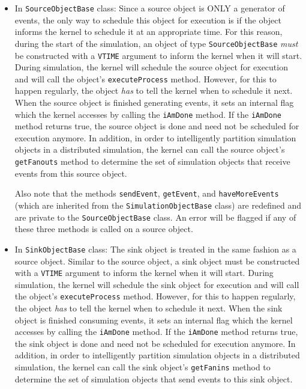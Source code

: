 \documentclass[11pt]{article}
\begin{document}
\begin{itemize}

\item In \texttt{SourceObjectBase} class:  Since a source object is ONLY a
  generator of events, the only way to schedule this object for execution
  is if the object informs the kernel to schedule it at an appropriate
  time.  For this reason, during the start of the simulation, an object of
  type \texttt{SourceObjectBase} \emph{must} be constructed with a
  \texttt{VTIME} argument to inform the kernel when it will start.  During
  simulation, the kernel will schedule the source object for execution and
  will call the object's \texttt{executeProcess} method. However, for this
  to happen regularly, the object \emph{has} to tell the kernel when to
  schedule it next.  When the source object is finished generating events,
  it sets an internal flag which the kernel accesses by calling the
  \texttt{iAmDone} method.  If the \texttt{iAmDone} method returns true,
  the source object is done and need not be scheduled for execution
  anymore.  In addition, in order to intelligently partition simulation
  objects in a distributed simulation, the kernel can call the source
  object's \texttt{getFanouts} method to determine the set of simulation
  objects that receive events from this source object.

  Also note that the methods \texttt{sendEvent}, \texttt{getEvent}, and
  \texttt{haveMoreEvents} (which are inherited from the
  \texttt{SimulationObjectBase} class) are redefined and are private to
  the \texttt{SourceObjectBase} class.  An error will be flagged if any of
  these three methods is called on a source object.

\item In \texttt{SinkObjectBase} class: The sink object is treated
 in the same fashion as a source object. Similar to the source object, a
 sink object must be constructed with a \texttt{VTIME} argument to inform
 the kernel when it will start.  During simulation, the kernel will
 schedule the sink object for execution and will call the object's
 \texttt{executeProcess} method.  However, for this to happen regularly,
 the object \emph{has} to tell the kernel when to schedule it next.  When
 the sink object is finished consuming events, it sets an internal flag
 which the kernel accesses by calling the \texttt{iAmDone} method.  If the
 \texttt{iAmDone} method returns true, the sink object is done and need
 not be scheduled for execution anymore.  In addition, in order to
 intelligently partition simulation objects in a distributed simulation,
 the kernel can call the sink object's \texttt{getFanins} method to
 determine the set of simulation objects that send events to this sink
 object.

\end{itemize}
\end{document}
